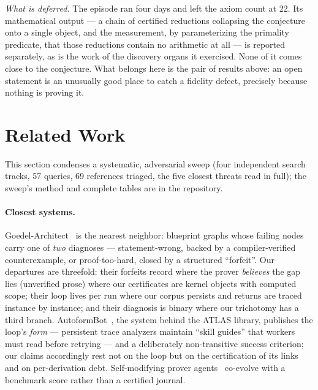 \documentclass[11pt]{article}
\theoremstyle{remark}\newtheorem{example}{Example}
\begin{document}
\emph{What is deferred.} The episode ran four days and left the axiom count at 22. Its
mathematical output --- a chain of certified reductions collapsing the conjecture onto a
single object, and the measurement, by parameterizing the primality predicate, that
those reductions contain no arithmetic at all --- is reported separately, as is the work
of the discovery organs it exercised. None of it comes close to the conjecture. What
belongs here is the pair of results above: an open statement is an unusually good place
to catch a fidelity defect, precisely because nothing is proving it.

\section{Related Work}
\label{sec:related}
This section condenses a systematic, adversarial sweep (four independent search
tracks, 57 queries, 69 references triaged, the five closest threats read in full);
the sweep's method and complete tables are in the repository.

\paragraph{Closest systems.}
Goedel-Architect~\cite{goedelarchitect2026} is the nearest neighbor: blueprint graphs
whose failing nodes carry one of \emph{two} diagnoses --- statement-wrong, backed by a
compiler-verified counterexample, or proof-too-hard, closed by a structured
``forfeit''. Our departures are threefold: their forfeits record where the prover
\emph{believes} the gap lies (unverified prose) where our certificates are kernel
objects with computed scope; their loop lives per run where our corpus persists and
returns are traced instance by instance; and their diagnosis is binary where our
trichotomy has a third branch. AutoformBot~\cite{atlas2026}, the system behind the
ATLAS library, publishes the loop's
\emph{form} --- persistent trace analyzers maintain ``skill guides'' that workers must
read before retrying --- and a deliberately non-transitive success criterion; our
claims accordingly rest not on the loop but on the certification of its links and on
per-derivation debt. Self-modifying prover agents~\cite{selfmodifying2026} co-evolve
with a benchmark score rather than a certified journal.
\end{document}

